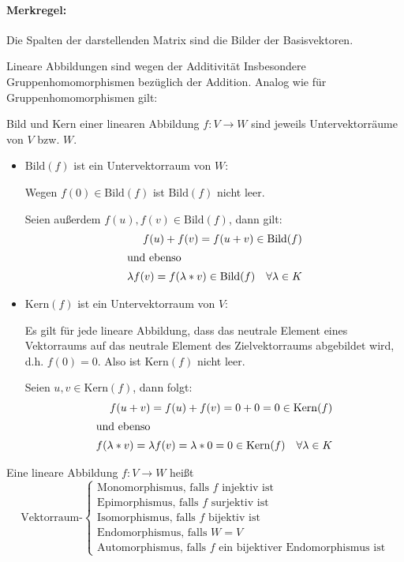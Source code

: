 \paragraph{Merkregel:}
Die Spalten der darstellenden Matrix sind die Bilder der Basisvektoren.
\par\bigskip


Lineare Abbildungen sind wegen der Additivität Insbesondere Gruppenhomomorphismen bezüglich der Addition. Analog wie für Gruppenhomomorphismen gilt:

\begin{satz}{}
  Bild und Kern einer linearen Abbildung $f:V\rightarrow W$ sind jeweils Untervektorräume von $V$ bzw. $W$.
\end{satz}

\beweis
\begin{itemize}
	\item $\mathrm{Bild}(f)$ ist ein Untervektorraum von $W$:

	Wegen $f(0)\in\mathrm{Bild}(f)$ ist $\mathrm{Bild}(f)$ nicht leer.

	Seien außerdem $f(u),f(v)\in\mathrm{Bild}(f)$, dann gilt:
	\begin{align*}
		f(u)+f(v)=f(u+v)\in\mathrm{Bild}(f)\\
		\intertext{und ebenso}
		\lambda f(v)=f(\lambda*v)\in\mathrm{Bild}(f) \quad \forall\lambda\in K
	\end{align*}

	\item $\mathrm{Kern}(f)$ ist ein Untervektorraum von $V$:

	Es gilt für jede lineare Abbildung, dass das neutrale Element eines Vektorraums auf das neutrale Element des Zielvektorraums abgebildet wird, d.h. $f(0)=0$. Also ist $\mathrm{Kern}(f)$ nicht leer.

	Seien $u,v\in \mathrm{Kern}(f)$, dann folgt:
	\begin{align*}
		f(u+v)=f(u)+f(v)=0+0=0 \in\mathrm{Kern}(f)\\
		\intertext{und ebenso}
		f(\lambda *v)=\lambda f(v)=\lambda*0=0\in\mathrm{Kern}(f) \quad\forall \lambda\in K
	\end{align*}
\end{itemize}


\begin{definition}{}
  Eine lineare Abbildung $f: V\rightarrow W$ heißt
  \begin{equation*}
    \text{Vektorraum-}
    \begin{cases}
      \text{Monomorphismus, falls $f$ injektiv ist}\\
      \text{Epimorphismus, falls $f$ surjektiv ist}\\
      \text{Isomorphismus, falls $f$ bijektiv ist}\\
			\text{Endomorphismus, falls $W=V$}\\
			\text{Automorphismus, falls $f$ ein bijektiver Endomorphismus ist}
    \end{cases}
  \end{equation*}
\end{definition}
